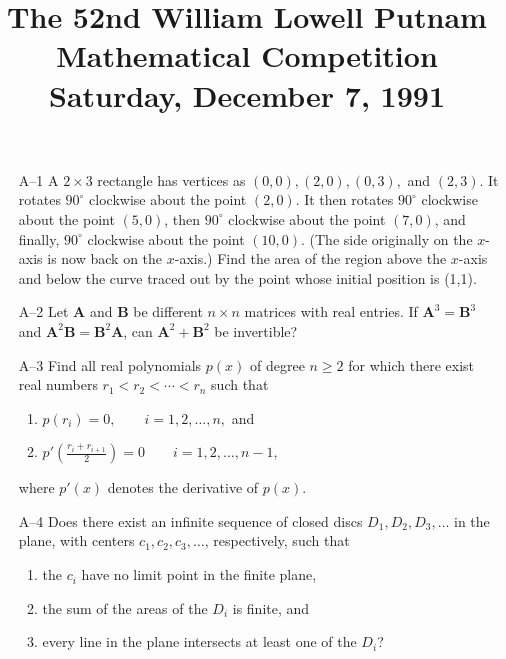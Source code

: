 \documentclass[amssymb,twocolumn,pra,10pt,aps]{revtex4-1}
\begin{document}
\title{The 52nd William Lowell Putnam Mathematical Competition \\
    Saturday, December 7, 1991}
\maketitle

\newcommand{\bA}{{\mathbf{A}}}
\newcommand{\bB}{{\mathbf{B}}}
\newcommand{\Z}{{\mathbb{Z}}}

\begin{itemize}
\item[A--1]
A $2 \times 3$ rectangle has vertices as $(0, 0), (2,0), (0,3),$ and $(2,
3)$. It rotates $90^\circ$ clockwise about the point $(2, 0)$. It then
rotates $90^\circ$ clockwise about the point $(5, 0)$, then $90^\circ$
clockwise about the point $(7, 0)$, and finally, $90^\circ$ clockwise
about the point $(10, 0)$. (The side originally on the $x$-axis is now
back on the $x$-axis.) Find the area of the region above the $x$-axis and
below the curve traced out by the point whose initial position is (1,1).

\item[A--2]
Let $\bA$ and $\bB$ be different $n \times n$ matrices with real entries.
If $\bA^3 = \bB^3$ and $\bA^2 \bB = \bB^2 \bA$, can $\bA^2 + \bB^2$ be
invertible?

\item[A--3]
Find all real polynomials $p(x)$ of degree $n \geq 2$ for which there
exist real numbers $r_1 < r_2 < \cdots < r_n$ such that
\begin{enumerate}
    \item $p(r_i) = 0, \qquad i = 1, 2, \dots, n,$ and
    \item $p' \left( \frac{r_i + r_{i+1}}{2} \right) = 0 \qquad i = 1, 2,
    \dots, n-1,$
\end{enumerate}
where $p'(x)$ denotes the derivative of $p(x)$.

\item[A--4]
Does there exist an infinite sequence of closed discs $D_1, D_2, D_3,
\dots$ in the plane, with centers $c_1, c_2, c_3, \dots$, respectively,
such that
\begin{enumerate}
    \item the $c_i$ have no limit point in the finite plane,
    \item the sum of the areas of the $D_i$ is finite, and
    \item every line in the plane intersects at least one of the $D_i$?
\end{enumerate}


\end{itemize}
\end{document}
